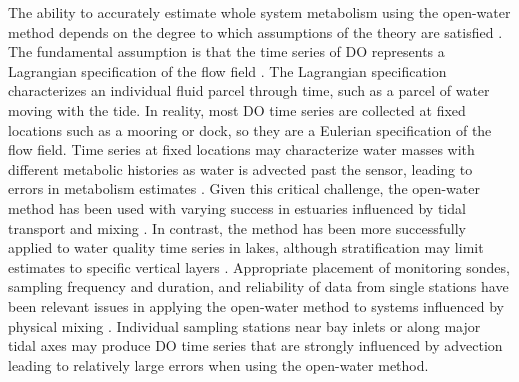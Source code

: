 \documentclass[letterpaper,12pt,oneside]{article}\usepackage[]{graphicx}\usepackage[]{color}
\begin{document}
The ability to accurately estimate whole system metabolism using the open-water method depends on the degree to which assumptions of the theory are satisfied \citep{Staehr10,Kemp12}.  The fundamental assumption is that the time series of \ac{DO} represents a Lagrangian specification of the flow field \citep{Needoba12}.  The Lagrangian specification characterizes an individual fluid parcel through time, such as a parcel of water moving with the tide.  In reality, most \ac{DO} time series are collected at fixed locations such as a mooring or dock, so they are a Eulerian specification of the flow field.  Time series at fixed locations may characterize water masses with different metabolic histories as water is advected past the sensor, leading to errors in metabolism estimates \citep{Kemp80,Russell07}.  Given this critical challenge, the open-water method has been used with varying success in estuaries influenced by tidal transport and mixing \citep{Caffrey04,Russell07,Caffrey14}.  In contrast, the method has been more successfully applied to water quality time series in lakes, although stratification may limit estimates to specific vertical layers \citep{Staehr10,Coloso11,Batt12}. Appropriate placement of monitoring sondes, sampling frequency and duration, and reliability of data from single stations have been relevant issues in applying the open-water method to systems influenced by physical mixing \citep{Russell07,Staehr10}.  Individual sampling stations near bay inlets or along major tidal axes may produce \ac{DO} time series that are strongly influenced by advection leading to relatively large errors when using the open-water method.   
\end{document}
